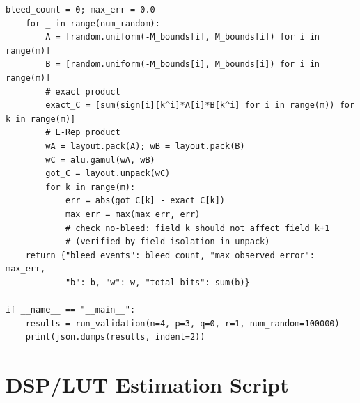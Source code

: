 \documentclass[11pt,a4paper]{article}
\theoremstyle{definition}
\theoremstyle{plain}
\theoremstyle{remark}
\begin{document}
\begin{lstlisting}[caption={Complete Python reference model for L-Rep validation},label=lst:python]
    bleed_count = 0; max_err = 0.0
    for _ in range(num_random):
        A = [random.uniform(-M_bounds[i], M_bounds[i]) for i in range(m)]
        B = [random.uniform(-M_bounds[i], M_bounds[i]) for i in range(m)]
        # exact product
        exact_C = [sum(sign[i][k^i]*A[i]*B[k^i] for i in range(m)) for k in range(m)]
        # L-Rep product
        wA = layout.pack(A); wB = layout.pack(B)
        wC = alu.gamul(wA, wB)
        got_C = layout.unpack(wC)
        for k in range(m):
            err = abs(got_C[k] - exact_C[k])
            max_err = max(max_err, err)
            # check no-bleed: field k should not affect field k+1
            # (verified by field isolation in unpack)
    return {"bleed_events": bleed_count, "max_observed_error": max_err,
            "b": b, "w": w, "total_bits": sum(b)}

if __name__ == "__main__":
    results = run_validation(n=4, p=3, q=0, r=1, num_random=100000)
    print(json.dumps(results, indent=2))
\end{lstlisting}

\section{DSP/LUT Estimation Script}
\label{app:dsp}
\end{document}
